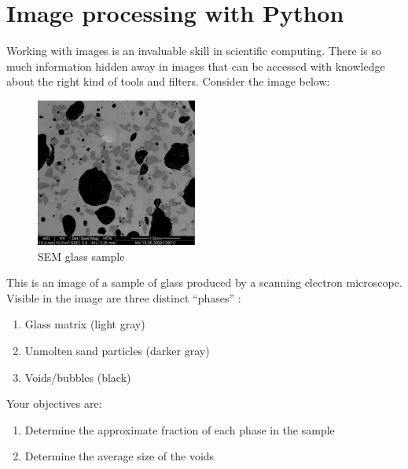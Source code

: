 \documentclass{article}
\begin{document}
\section*{Image processing with Python}
Working with images is an invaluable skill in scientific computing. There is so
much information hidden away in images that can be accessed with knowledge about
the right kind of tools and filters.
\newline \newline
Consider the image below:
\begin{figure}[h]
\begin{center}
\includegraphics[width=150pt]{../pictures/MV_HFV_012.jpg}
\caption{SEM glass sample}
\end{center}
\end{figure}
\newline
This is an image of a sample of glass produced by a scanning electron microscope.
Visible in the image are three distinct ``phases'' : 
\begin{enumerate}
\item Glass matrix (light gray)
\item Unmolten sand particles (darker gray)
\item Voids/bubbles (black)
\newline
\end{enumerate} 
Your objectives are:
\begin{enumerate}
\item Determine the approximate fraction of each phase in the sample
\item Determine the average size of the voids
\end{enumerate} 
\end{document}
